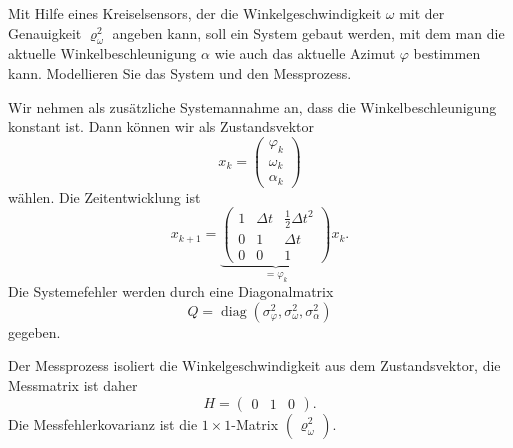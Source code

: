 Mit Hilfe eines Kreiselsensors, der die Winkelgeschwindigkeit $\omega$
mit der Genauigkeit $\varrho_{\omega}^2$ angeben kann, soll ein System gebaut
werden, mit dem man die aktuelle Winkelbeschleunigung $\alpha$ wie auch
das aktuelle Azimut $\varphi$ bestimmen kann.
Modellieren Sie das System und den Messprozess.

\begin{loesung}
Wir nehmen als zusätzliche Systemannahme an, dass die Winkelbeschleunigung
konstant ist.
Dann können wir als Zustandsvektor
\[
x_k=\begin{pmatrix}\varphi_k\\\omega_k\\\alpha_k\end{pmatrix}
\]
wählen.
Die Zeitentwicklung ist
\[
x_{k+1}=\underbrace{\begin{pmatrix}
1&\Delta t&\frac12\Delta t^2\\
0&1       &\Delta t\\
0&0       &1
\end{pmatrix}}_{=\varphi_k}x_k.
\]
Die Systemefehler werden durch eine Diagonalmatrix
\[
Q=\operatorname{diag}(\sigma_{\varphi}^2, \sigma_{\omega}^2, \sigma_{\alpha}^2)
\]
gegeben.

Der Messprozess isoliert die Winkelgeschwindigkeit aus dem Zustandsvektor,
die Messmatrix ist daher
\[
H=\begin{pmatrix}
0&1&0
\end{pmatrix}.
\]
Die Messfehlerkovarianz ist die $1\times 1$-Matrix
$\begin{pmatrix}\varrho_\omega^2\end{pmatrix}$.
\end{loesung}


